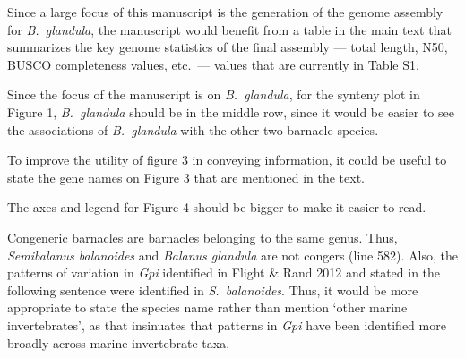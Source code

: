 
\begin{point}{} %
Since a large focus of this manuscript is the generation of the genome
assembly for \emph{B.\ glandula}, the manuscript would benefit from a
table in the main text that summarizes the key genome statistics of the
final assembly --- total length, N50, BUSCO completeness values, etc.\
--- values that are currently in Table S1.
\end{point}


\begin{point}{} %
Since the focus of the manuscript is on \emph{B.\ glandula}, for the
synteny plot in Figure 1, \emph{B.\ glandula} should be in the middle
row, since it would be easier to see the associations of \emph{B.\
glandula} with the other two barnacle species.
\end{point}


\begin{point}{} %
To improve the utility of figure 3 in conveying information, it could be
useful to state the gene names on Figure 3 that are mentioned in the
text.
\end{point}


\begin{point}{} %
The axes and legend for Figure 4 should be bigger to make it easier to
read.
\end{point}


\begin{point}{} %
Congeneric barnacles are barnacles belonging to the same genus. Thus,
\emph{Semibalanus balanoides} and \emph{Balanus glandula} are not congers
(line 582). Also, the patterns of variation in \emph{Gpi} identified in
Flight \& Rand 2012 and stated in the following sentence were identified
in \emph{S.\ balanoides}. Thus, it would be more appropriate to state the
species name rather than mention `other marine invertebrates', as that
insinuates that patterns in \emph{Gpi} have been identified more broadly
across marine invertebrate taxa.
\end{point}

